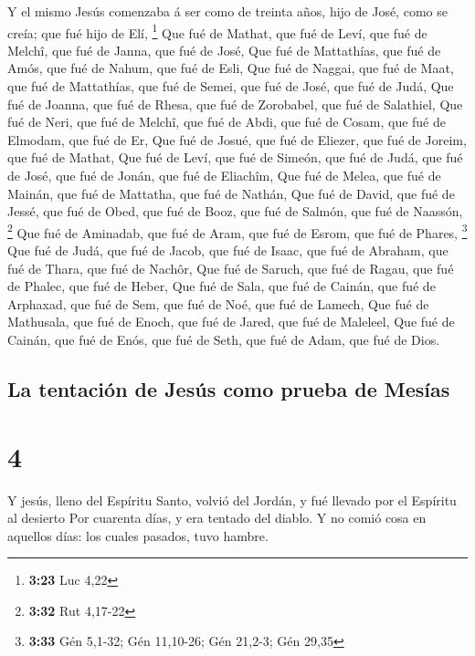  Y el mismo Jesús comenzaba á ser como de treinta años,
hijo de José, como se creía; que fué hijo de Elí, \footnote{\textbf{3:23}
  Luc 4,22}  Que fué de Mathat, que fué de Leví, que fué de
Melchî, que fué de Janna, que fué de José,  Que fué de
Mattathías, que fué de Amós, que fué de Nahum, que fué de Esli,
 Que fué de Naggai, que fué de Maat, que fué de Mattathías,
que fué de Semei, que fué de José, que fué de Judá,  Que
fué de Joanna, que fué de Rhesa, que fué de Zorobabel, que fué de
Salathiel,  Que fué de Neri, que fué de Melchî, que fué de
Abdi, que fué de Cosam, que fué de Elmodam, que fué de Er, 
Que fué de Josué, que fué de Eliezer, que fué de Joreim, que fué de
Mathat,  Que fué de Leví, que fué de Simeón, que fué de
Judá, que fué de José, que fué de Jonán, que fué de Eliachîm,
 Que fué de Melea, que fué de Mainán, que fué de Mattatha,
que fué de Nathán,  Que fué de David, que fué de Jessé, que
fué de Obed, que fué de Booz, que fué de Salmón, que fué de Naassón,
\footnote{\textbf{3:32} Rut 4,17-22}  Que fué de Aminadab,
que fué de Aram, que fué de Esrom, que fué de Phares, \footnote{\textbf{3:33}
  Gén 5,1-32; Gén 11,10-26; Gén 21,2-3; Gén 29,35}  Que fué
de Judá, que fué de Jacob, que fué de Isaac, que fué de Abraham, que fué
de Thara, que fué de Nachôr,  Que fué de Saruch, que fué de
Ragau, que fué de Phalec, que fué de Heber,  Que fué de
Sala, que fué de Cainán, que fué de Arphaxad, que fué de Sem, que fué de
Noé, que fué de Lamech,  Que fué de Mathusala, que fué de
Enoch, que fué de Jared, que fué de Maleleel,  Que fué de
Cainán, que fué de Enós, que fué de Seth, que fué de Adam, que fué de
Dios.

\hypertarget{la-tentaciuxf3n-de-jesuxfas-como-prueba-de-mesuxedas}{%
\subsection{La tentación de Jesús como prueba de
Mesías}\label{la-tentaciuxf3n-de-jesuxfas-como-prueba-de-mesuxedas}}

\hypertarget{section-3}{%
\section{4}\label{section-3}}

 Y jesús, lleno del Espíritu Santo, volvió del Jordán, y fué
llevado por el Espíritu al desierto  Por cuarenta días, y
era tentado del diablo. Y no comió cosa en aquellos días: los cuales
pasados, tuvo hambre.

